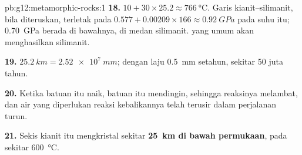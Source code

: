 \begin{solution}{pb:g12:metamorphic-rocks:1}
\textbf{18.} $10 + 30 \times 25.2 \approx \qty{766}{\celsius}$. Garis
kianit--silimanit, bila diteruskan, terletak pada $0.577 + 0.00209 \times 166
\approx \qty{0.92}{GPa}$ pada suhu itu; \qty{0.70}{GPa} berada di bawahnya,
di medan silimanit.  yang umum akan menghasilkan silimanit.

\textbf{19.} $\qty{25.2}{km} = \qty{2.52e7}{mm}$; dengan laju \qty{0.5}{mm}
setahun, sekitar 50 juta tahun.

\textbf{20.} Ketika batuan itu naik, batuan itu mendingin, sehingga reaksinya
melambat, dan air yang diperlukan reaksi kebalikannya telah terusir dalam
perjalanan turun.

\textbf{21.} Sekis kianit itu mengkristal sekitar \textbf{\qty{25}{km} di
bawah permukaan}, pada sekitar \qty{600}{\celsius}.
\end{solution}
